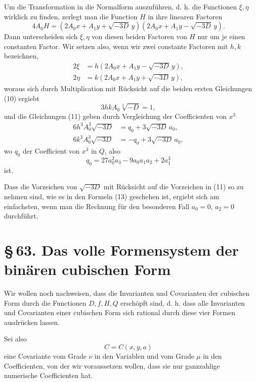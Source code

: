 \documentclass[11pt]{article}
\newcommand{\sect}[2]{\section*{\S\,#1. #2}}
\begin{document}
Um die Transformation in die Normalform auszuführen, d. h. die Functionen $\xi,\eta$ wirklich zu finden, zerlegt man die Function $H$ in ihre linearen Factoren
\[
 4A_0H=(2A_0x+A_1y+\sqrt{-3D}\,y)(2A_0x+A_1y-\sqrt{-3D}\,y).
\]
Dann unterscheiden sich $\xi,\eta$ von diesen beiden Factoren von $H$ nur um je einen constanten Factor. Wir setzen also, wenn wir zwei constante Factoren mit $h,k$ bezeichnen,
\begin{equation}
\begin{aligned}
 2\xi&=h(2A_0x+A_1y-\sqrt{-3D}\,y),\\
 2\eta&=k(2A_0x+A_1y+\sqrt{-3D}\,y),
\end{aligned}
\tag{13}
\end{equation}
woraus sich durch Multiplication mit Rücksicht auf die beiden ersten Gleichungen (10) ergiebt
\begin{equation}
 3hkA_0\sqrt[3]{-D}=1,
\tag{14}
\end{equation}
und die Gleichungen (11) geben durch Vergleichung der Coefficienten von $x^3$
\begin{equation}
\begin{aligned}
 6h^3A_0^3\sqrt{-3D}&=q_0+3\sqrt{-3D}\,a_0,\\
 6k^3A_0^3\sqrt{-3D}&=-q_0+3\sqrt{-3D}\,a_0,
\end{aligned}
\tag{15}
\end{equation}
wo $q_0$ der Coefficient von $x^3$ in $Q$, also
\begin{equation}
 q_0=27a_0^2a_3-9a_0a_1a_2+2a_1^3
\tag{16}
\end{equation}
ist.

Dass die Vorzeichen von $\sqrt{-3D}$ mit Rücksicht auf die Vorzeichen in (11) so zu nehmen sind, wie es in den Formeln (13) geschehen ist, ergiebt sich am einfachsten, wenn man die Rechnung für den besonderen Fall $a_0=0$, $a_2=0$ durchführt.

\sect{63}{Das volle Formensystem der binären cubischen Form}

Wir wollen noch nachweisen, dass die Invarianten und Covarianten der cubischen Form durch die Functionen $D,f,H,Q$ erschöpft sind, d. h. dass alle Invarianten und Covarianten einer cubischen Form sich rational durch diese vier Formen ausdrücken lassen.

Sei also
\[
 C=C(x,y,a)
\]
eine Covariante vom Grade $\nu$ in den Variablen und vom Grade $\mu$ in den Coefficienten, von der wir voraussetzen wollen, dass sie nur ganzzahlige numerische Coefficienten hat.
\end{document}
